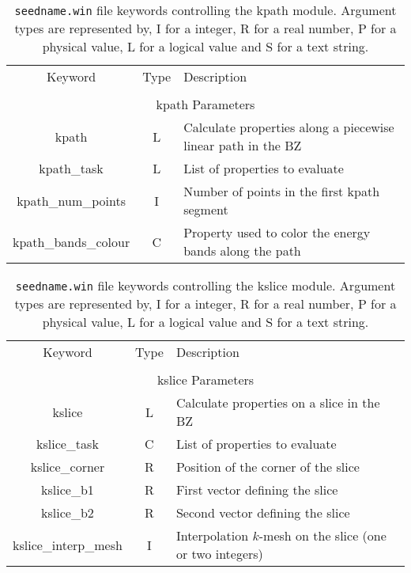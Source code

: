 \begin{table}[hH!]
\begin{center}
\begin{tabular}{|c|c|p{6cm}|}
  \hline
  Keyword & Type & Description \\
  &      &             \\
  \hline\hline
  \multicolumn{3}{|c|}{kpath Parameters} \\
  \hline
  {\sc kpath}  & L & Calculate properties along a piecewise linear path in the BZ \\
  {\sc kpath\_task}& L & List of properties to evaluate\\
  {\sc kpath\_num\_points}& I & Number of points in the first kpath segment\\
  {\sc kpath\_bands\_colour}& C & Property used to color the energy bands along the path\\
  \hline
\end{tabular}
\caption[Parameter file keywords controlling the kpath module.]
{{\tt seedname.win} file keywords controlling the kpath module. Argument types
are represented by, I for a integer, R for a real number, P for a
physical value, L for a logical value and S for a text string.}
\label{parameter_keywords_kpath}
\end{center}
\end{table}

\begin{table}[hH!]
\begin{center}
\begin{tabular}{|c|c|p{6cm}|}
\hline
Keyword & Type & Description \\
        &      &             \\
\hline\hline
\multicolumn{3}{|c|}{kslice Parameters} \\
\hline
{\sc kslice}  & L & Calculate properties on a slice in the BZ \\
{\sc kslice\_task}& C & List of properties to evaluate\\
{\sc kslice\_corner}& R & Position of the corner of the slice\\
{\sc kslice\_b1}& R & First vector defining the slice\\
{\sc kslice\_b2}& R & Second vector defining the slice\\
{\sc kslice\_interp\_mesh}& I & Interpolation $k$-mesh
on the slice (one or two integers)\\
\hline
\end{tabular}
\caption[Parameter file keywords controlling the kslice module.]
{{\tt seedname.win} file keywords controlling the kslice module. Argument types
are represented by, I for a integer, R for a real number, P for a
physical value, L for a logical value and S for a text string.}
\label{parameter_keywords_kslice}
\end{center}
\end{table}



